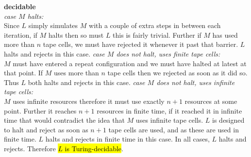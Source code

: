 \documentclass[12pt]{jhwhw}
\newcommand{\hlgreen}[1]{{\sethlcolor{lime}\hl{#1}}}
\begin{document}
	\bigbreak
	\textbf{decidable} \\
		\textit{case $M$ halts:} \\
			Since $L$ simply simulates $M$ with a couple of extra steps in between each iteration,
			if $M$ halts then so must $L$ this is fairly trivial. Further if $M$ has used more
			than $n$ tape cells, we must have rejected it whenever it past that barrier.
			$L$ halts and rejects in this case.
		\bigbreak
		\textit{case $M$ does not halt, uses finite tape cells:} \\
			$M$ must have entered a repeat configuration and we must have halted at latest at that point.
			If $M$ uses more than $n$ tape cells then we rejected as soon as it did so. Thus $L$ both
			halts and rejects in this case.
		\bigbreak
		\textit{case $M$ does not halt, uses infinite tape cells:} \\
			$M$ uses infinite resources therefore it must use exactly $n+1$ resources at some point.
			Further it reaches $n+1$ resources in finite time, if it reached it in infinite time that
			would contradict the idea that $M$ uses infinite tape cells. $L$ is designed to halt
			and reject as soon as $n+1$ tape cells are used, and as these are used in finite time.
			$L$ halts and rejects in finite time in this case.
		\bigbreak
		In all cases, $L$ halts and rejects. Therefore \hlgreen{$L$ is Turing-decidable}.
\end{document}
